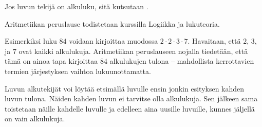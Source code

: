 Jos luvun tekijä on alkuluku, sitä kutsutaan .

% 	


Aritmetiikan peruslause todistetaan kurssilla Logiikka ja lukuteoria. %
    
Esimerkiksi luku $84$ voidaan kirjoittaa muodossa $2\cdot 2\cdot 3\cdot 7$. Havaitaan, että $2$, $3$, ja $7$ ovat kaikki alkulukuja. Aritmetiikan peruslauseen nojalla tiedetään, että tämä on ainoa tapa kirjoittaa $84$ alkulukujen tulona -- mahdollista kerrottavien termien järjestyksen vaihtoa lukuunottamatta.

Luvun alkutekijät voi löytää etsimällä luvulle ensin jonkin esityksen kahden luvun tulona. Näiden kahden luvun ei tarvitse olla alkulukuja. Sen jälkeen sama toistetaan näille kahdelle luvulle ja edelleen aina uusille luvuille, kunnes jäljellä on vain alkulukuja.

% 	


